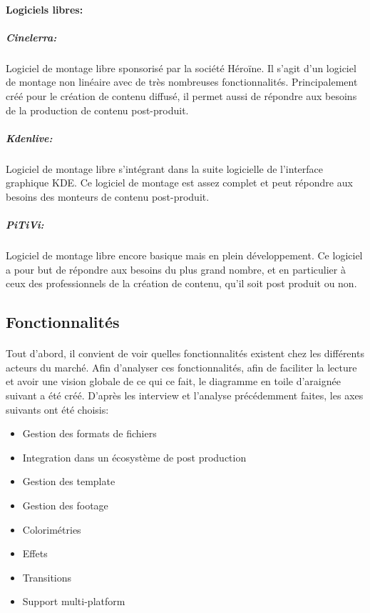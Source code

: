 \paragraph {Logiciels libres:}

\subparagraph{Cinelerra:}

Logiciel de montage libre sponsorisé par la société Héroïne. Il s'agit d'un logiciel
de montage non linéaire avec de très nombreuses fonctionnalités. Principalement créé pour le création de contenu
diffusé, il permet aussi de répondre aux besoins de la production de contenu post-produit.

\subparagraph{Kdenlive:}

Logiciel de montage libre s'intégrant dans la suite logicielle de l'interface graphique KDE.
Ce logiciel de montage est assez complet et peut répondre aux besoins des monteurs de contenu post-produit.

\subparagraph{PiTiVi:}

Logiciel de montage libre encore basique mais en plein développement.
Ce logiciel a pour but de répondre aux besoins du plus grand nombre,
et en particulier à ceux des professionnels de la création de contenu,
qu'il soit post produit ou non.


\subsection{Fonctionnalités}
  \paragraph{}
  Tout d'abord, il convient de voir quelles fonctionnalités existent chez les différents
  acteurs du marché. Afin d'analyser ces fonctionnalités, afin de faciliter la lecture et
  avoir une vision globale de ce qui ce fait, le diagramme en toile d'araignée suivant a été créé.
  D'après les interview et l'analyse précédemment faites, les axes suivants ont été choisis:
\begin{itemize} \setlength{\itemsep}{2mm}
    \item{Gestion des formats de fichiers}
    \item{Integration dans un écosystème de post production}
    \item{Gestion des template}
    \item{Gestion des footage}
    \item{Colorimétries}
    \item{Effets}
    \item{Transitions}
    \item{Support multi-platform}
  \end {itemize}


